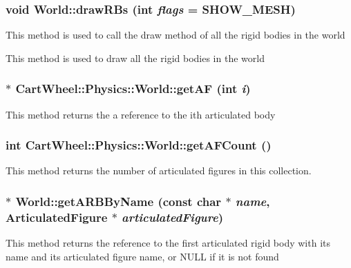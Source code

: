 \hypertarget{classCartWheel_1_1Physics_1_1World_aaeb871501b82144005d7c83ad6d88aeb}{
\subsubsection[{drawRBs}]{\setlength{\rightskip}{0pt plus 5cm}void World::drawRBs (int {\em flags} = {\ttfamily SHOW\_\-MESH})}}
\label{classCartWheel_1_1Physics_1_1World_aaeb871501b82144005d7c83ad6d88aeb}
This method is used to call the draw method of all the rigid bodies in the world

This method is used to draw all the rigid bodies in the world \hypertarget{classCartWheel_1_1Physics_1_1World_ad0f9799acc13594e77dbf37654244868}{
\subsubsection[{getAF}]{$\ast$ CartWheel::Physics::World::getAF (int {\em i})}}
\label{classCartWheel_1_1Physics_1_1World_ad0f9799acc13594e77dbf37654244868}
This method returns the a reference to the ith articulated body \hypertarget{classCartWheel_1_1Physics_1_1World_a715ae803217d1c465ec331c6eff89397}{
\subsubsection[{getAFCount}]{\setlength{\rightskip}{0pt plus 5cm}int CartWheel::Physics::World::getAFCount ()}}
\label{classCartWheel_1_1Physics_1_1World_a715ae803217d1c465ec331c6eff89397}
This method returns the number of articulated figures in this collection. \hypertarget{classCartWheel_1_1Physics_1_1World_a9756f61b281bcec50e35defdb84b067b}{
\subsubsection[{getARBByName}]{ $\ast$ World::getARBByName (const char $\ast$ {\em name}, \/  {\bf ArticulatedFigure} $\ast$ {\em articulatedFigure})}}
\label{classCartWheel_1_1Physics_1_1World_a9756f61b281bcec50e35defdb84b067b}
This method returns the reference to the first articulated rigid body with its name and its articulated figure name, or NULL if it is not found

